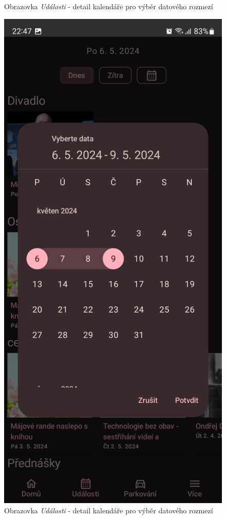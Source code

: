 \begin{figure}[H]
    \caption{Obrazovka \textit{Události} - detail kalendáře pro výběr datového rozmezí}
  \endminipage\hfill
    \includegraphics[width=\linewidth]{screens/2b_B.jpg}
    \caption{Obrazovka \textit{Události} - detail kalendáře pro výběr datového rozmezí}
  \endminipage\hfill
\end{figure}

